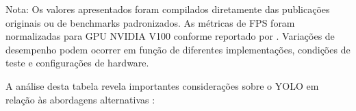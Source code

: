 \begin{table}[h] 
\centering
{}

\footnotesize{Nota: Os valores apresentados foram compilados diretamente das publicações originais ou de benchmarks padronizados. As métricas de FPS foram normalizadas para GPU NVIDIA V100 conforme reportado por \cite{carion2020end,liu2020deep}. Variações de desempenho podem ocorrer em função de diferentes implementações, condições de teste e configurações de hardware.}
\caption{Análise comparativa entre arquiteturas de detecção de objetos.}
\label{tab:comparacao_arquiteturas}
\end{table}

A análise desta tabela revela importantes considerações sobre o YOLO em relação às abordagens alternativas \cite{redmon2016lookonceunifiedrealtime, wang2024yolov10realtimeendtoendobject}:

